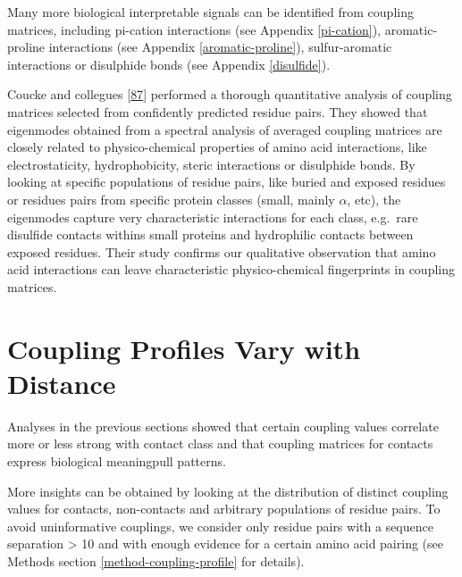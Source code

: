 \documentclass[12pt,a4paper,twoside]{book}
\theoremstyle{definition}
\theoremstyle{definition}
\theoremstyle{remark}
\begin{document}
Many more biological interpretable signals can be identified from
coupling matrices, including pi-cation interactions (see Appendix
\ref{pi-cation}), aromatic-proline interactions (see Appendix
\ref{aromatic-proline}), sulfur-aromatic interactions or disulphide
bonds (see Appendix \ref{disulfide}).

Coucke and collegues {[}\protect\hyperlink{ref-Coucke2016}{87}{]}
performed a thorough quantitative analysis of coupling matrices selected
from confidently predicted residue pairs. They showed that eigenmodes
obtained from a spectral analysis of averaged coupling matrices are
closely related to physico-chemical properties of amino acid
interactions, like electrostaticity, hydrophobicity, steric interactions
or disulphide bonds. By looking at specific populations of residue
pairs, like buried and exposed residues or residues pairs from specific
protein classes (small, mainly \(\alpha\), etc), the eigenmodes capture
very characteristic interactions for each class, e.g.~rare disulfide
contacts withins small proteins and hydrophilic contacts between exposed
residues. Their study confirms our qualitative observation that amino
acid interactions can leave characteristic physico-chemical fingerprints
in coupling matrices.

\section{Coupling Profiles Vary with
Distance}\label{coupling-profiles-vary-with-distance}

Analyses in the previous sections showed that certain coupling values
correlate more or less strong with contact class and that coupling
matrices for contacts express biological meaningpull patterns.

More insights can be obtained by looking at the distribution of distinct
coupling values for contacts, non-contacts and arbitrary populations of
residue pairs. To avoid uninformative couplings, we consider only
residue pairs with a sequence separation \textgreater{} 10 and with
enough evidence for a certain amino acid pairing (see Methods section
\ref{method-coupling-profile} for details).
\end{document}
